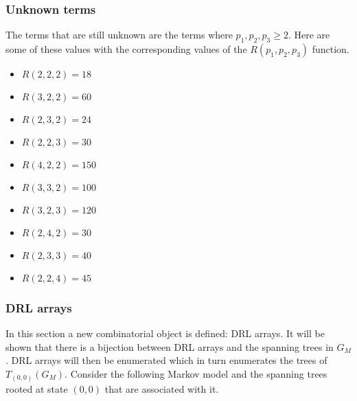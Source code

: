 \subsubsection{Unknown terms}

The terms that are still unknown are the terms where \(p_1, p_2, p_3 \geq 2\).
Here are some of these values with the corresponding values of the
\(R(p_1,p_2,p_3)\) function.

\begin{multicols}{2}
    \begin{itemize}
        \item \(R(2,2,2) = 18\)
        \item \(R(3,2,2) = 60\)
        \item \(R(2,3,2) = 24\)
        \item \(R(2,2,3) = 30\)
        \item \(R(4,2,2) = 150\)
        \item \(R(3,3,2) = 100\)
        \item \(R(3,2,3) = 120\)
        \item \(R(2,4,2) = 30\)
        \item \(R(2,3,3) = 40\)
        \item \(R(2,2,4) = 45\)
    \end{itemize}
\end{multicols}

\subsubsection{DRL arrays}

In this section a new combinatorial object is defined: DRL arrays.
It will be shown that there is a bijection between DRL arrays and the spanning
trees in \(G_M\).
DRL arrays will then be enumerated which in turn enumerates the trees of
\(T_{(0,0)}(G_M)\).
Consider the following Markov model and the spanning trees rooted at state
\((0,0)\) that are associated with it.


